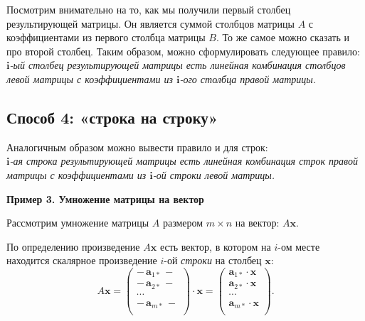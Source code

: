 \documentclass[11pt,a4paper]{article}
\begin{document}
Посмотрим внимательно на то, как мы получили первый столбец
результирующей матрицы. Он является суммой столбцов матрицы \(A\) с
коэффициентами из первого столбца матрицы \(B\). То же самое можно
сказать и про второй столбец. Таким образом, можно сформулировать
следующее правило:\\
\emph{\(\mathbf{i}\)-ый столбец результирующей матрицы есть линейная
комбинация столбцов левой матрицы с коэффициентами из \(\mathbf{i}\)-ого
столбца правой матрицы.}

    \hypertarget{ux441ux43fux43eux441ux43eux431-4-ux441ux442ux440ux43eux43aux430-ux43dux430-ux441ux442ux440ux43eux43aux443}{%
\subsection{Способ 4: «строка на
строку»}\label{ux441ux43fux43eux441ux43eux431-4-ux441ux442ux440ux43eux43aux430-ux43dux430-ux441ux442ux440ux43eux43aux443}}

Аналогичным образом можно вывести правило и для строк:\\
\emph{\(\mathbf{i}\)-ая строка результирующей матрицы есть линейная
комбинация строк правой матрицы с коэффициентами из \(\mathbf{i}\)-ой
строки левой матрицы.}

    \textbf{Пример 3. Умножение матрицы на вектор}

Рассмотрим умножение матрицы \(A\) размером \(m \times n\) на вектор:
\(A \mathbf{x}\).

По определению произведение \(A \mathbf{x}\) есть вектор, в котором на
\(i\)-ом месте находится скалярное произведение \(i\)-ой \emph{строки}
на столбец \(\mathbf{x}\): \[
  A \mathbf{x} = 
  \begin{pmatrix}
    -\, \mathbf{a}_{1*} \,- \\
    -\, \mathbf{a}_{2*} \,- \\
    \cdots \\
    -\, \mathbf{a}_{m*} \,- \\
  \end{pmatrix}
  \cdot \mathbf{x} = 
  \begin{pmatrix}
    \mathbf{a}_{1*} \cdot \mathbf{x} \\
    \mathbf{a}_{2*} \cdot \mathbf{x} \\
    \cdots \\
    \mathbf{a}_{m*} \cdot \mathbf{x} \\
  \end{pmatrix}.
\]
\end{document}
